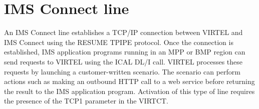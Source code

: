 \documentclass[letterpaper,10pt,english]{sphinxmanual}
\begin{document}
\begin{sphinxVerbatim}[commandchars=\\\{\}]
  
  
  
  
  
  
\end{sphinxVerbatim}

\newpage


\section{IMS Connect line}
\label{\detokenize{connectivity_guide:index-22}}\label{\detokenize{connectivity_guide:ims-connect-line}}
An IMS Connect line establishes a TCP/IP connection between VIRTEL and IMS Connect using the RESUME TPIPE protocol. Once the connection is established, IMS application programs running in an MPP or BMP region can send requests to VIRTEL using the ICAL DL/I call. VIRTEL processes these requests by launching a customer-written scenario. The scenario can perform actions such as making an outbound HTTP call to a web service before returning the result to the IMS application program. Activation of this type of line requires the presence of the TCP1 parameter in the VIRTCT.

\end{document}
